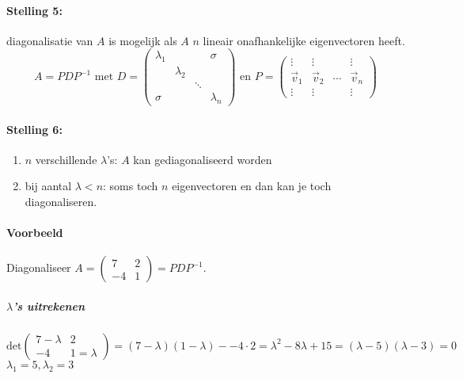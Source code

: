 \paragraph{Stelling 5:} diagonalisatie van $A$ is mogelijk als $A$ $n$ lineair onafhankelijke eigenvectoren heeft.
\[ A = PDP^{-1} \mbox{ met } D = \begin{pmatrix}
	\lambda_1 & & & \sigma \\
	& \lambda_2 & & \\
	& & \ddots & \\
	\sigma & & & \lambda_n
\end{pmatrix} \mbox{ en } P = \begin{pmatrix}
	\vdots & \vdots & & \vdots \\
	\vec{v}_1 & \vec{v}_2 & \cdots & \vec{v}_n \\
	\vdots & \vdots && \vdots
\end{pmatrix} \]

\paragraph{Stelling 6:}
\begin{enumerate}
	\item $n$ verschillende $\lambda$'s: $A$ kan gediagonaliseerd worden
	\item bij aantal $\lambda<n$: soms toch $n$ eigenvectoren en dan kan je toch diagonaliseren.
\end{enumerate}

\paragraph{Voorbeeld} Diagonaliseer $A = \begin{pmatrix*} 7 & 2 \\ -4 & 1 \end{pmatrix*} = PDP^{-1}$.

\subparagraph{$\lambda$'s uitrekenen}
\[ \mbox{det} \begin{pmatrix}
	7 - \lambda & 2 \\
	-4 & 1 = \lambda
\end{pmatrix} = (7-\lambda)(1-\lambda)--4 \cdot 2 = \lambda^2 - 8 \lambda + 15 = (\lambda -5)(\lambda -3) = 0 \]
$\lambda_1 =5, \lambda_2 = 3$

